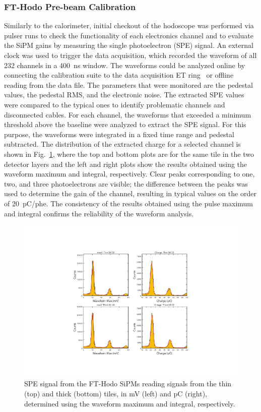\subsubsection{FT-Hodo Pre-beam Calibration}

Similarly to the calorimeter, initial checkout of the hodoscope was performed via pulser runs to check the
functionality of each electronics channel and to evaluate the SiPM gains by measuring the single photoelectron (SPE)
signal. An external clock was used to trigger the data acquisition, which recorded the waveform of all 232 channels
in a 400~ns window. The waveforms could be analyzed online by connecting the calibration suite to the data acquisition
ET ring~\cite{daq} or offline reading from the data file. The parameters that were monitored are the pedestal
values, the pedestal RMS, and the electronic noise. The extracted SPE values were compared to the typical ones to
identify problematic channels and disconnected cables. For each channel, the waveforms that exceeded a minimum
threshold above the baseline were analyzed to extract the SPE signal. For this purpose, the waveforms were
integrated in a fixed time range and pedestal subtracted. The distribution of the extracted charge for a selected
channel is shown in Fig.~\ref{fig:fthodo_spe}, where the top and bottom plots are for the same tile in the two detector
layers and the left and right plots show the results obtained using the waveform maximum and integral, respectively.
Clear peaks corresponding to one, two, and three photoelectrons are visible; the difference between the peaks was
used to determine the gain of the channel, resulting in typical values on the order of 20~pC/phe. The consistency of
the results obtained using the pulse maximum and integral confirms the reliability of the waveform analysis.

\begin{figure}
\includegraphics[width=1.0\columnwidth]{fig/fthodo_spe_2.pdf}
\caption{SPE signal from the FT-Hodo SiPMs reading signals from the thin (top) and thick (bottom) tiles, in mV
  (left) and pC (right), determined using the waveform maximum and integral, respectively.}
\label{fig:fthodo_spe}
\end{figure}

